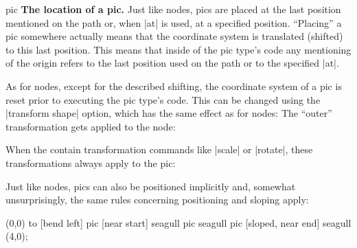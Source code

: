 \begin{pathoperation}{pic}
    \medskip
    \textbf{The location of a pic.}
    Just like nodes, pics are placed at the last position mentioned on the path
    or, when |at| is used, at a specified position. ``Placing'' a pic somewhere
    actually means that the coordinate system is translated (shifted) to this
    last position. This means that inside of the pic type's code any mentioning
    of the origin refers to the last position used on the path or to the
    specified |at|.
\begin{codeexample}[
    pre={\tikzset{
  seagull/.pic={
    \draw (-3mm,0) to [bend left] (0,0) to [bend left] (3mm,0);
  },
}}]
\end{codeexample}

    As for nodes, except for the described shifting, the coordinate system of a
    pic is reset prior to executing the pic type's code. This can be changed
    using the |transform shape| option, which has the same effect as for nodes:
    The ``outer'' transformation gets applied to the node:
\begin{codeexample}[
    pre={\tikzset{
  seagull/.pic={
    \draw (-3mm,0) to [bend left] (0,0) to [bend left] (3mm,0);
  },
}}]
\end{codeexample}

    When the  contain transformation commands like |scale| or
    |rotate|, these transformations always apply to the pic:
\begin{codeexample}[
    pre={\tikzset{
  seagull/.pic={
    \draw (-3mm,0) to [bend left] (0,0) to [bend left] (3mm,0);
  },
}}]
\end{codeexample}

    Just like nodes, pics can also be positioned implicitly and, somewhat
    unsurprisingly, the same rules concerning positioning and sloping apply:
\begin{codeexample}[
    pre={\tikzset{
  seagull/.pic={
    \draw (-3mm,0) to [bend left] (0,0) to [bend left] (3mm,0);
  },
}}]
\tikz \draw
  (0,0) to [bend left]
           pic [near start]       {seagull}
           pic                    {seagull}
           pic [sloped, near end] {seagull} (4,0);
\end{codeexample}


\end{pathoperation}
